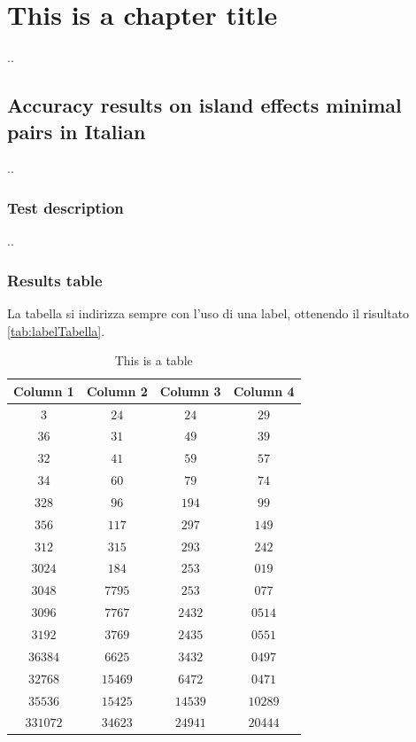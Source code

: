 \chapter{This is a chapter title}

..

\section{Accuracy results on island effects minimal pairs in Italian}

..

\subsection{Test description}

..

\subsection{Results table}


La tabella si indirizza sempre con l'uso di una label, ottenendo il risultato \autoref{tab:labelTabella}.

\begin{table}
	\caption{This is a table}\label{tab:labelTabella}
	\begin{center}
		\begin{tabular}{c|c|c|c}
			\textbf{Column 1} & \textbf{Column 2} & \textbf{Column 3} & \textbf{Column 4} \\
			\hline
			$3$      & $24$     & $24$    & $29$ \\ 
			$36$     & $31$     & $49$    & $39$ \\ 
			$32$     & $41$     & $59$    & $57$ \\ 
			$34$     & $60$     & $79$    & $74$ \\ 
			$328$    & $96$     & $194$   & $99$ \\ 
			$356$    & $117$    & $297$   & $149$ \\ 
			$312$    & $315$    & $293$   & $242$ \\ 
			$3024$   & $184$    & $253$   & $019$ \\ 
			$3048$   & $7795$   & $253$   & $077$ \\ 
			$3096$   & $7767$   & $2432$  & $0514$ \\ 
			$3192$   & $3769$   & $2435$  & $0551$ \\ 
			$36384$  & $6625$   & $3432$  & $0497$ \\ 
			$32768$  & $15469$  & $6472$  & $0471$ \\ 
			$35536$  & $15425$  & $14539$ & $10289$ \\ 
			$331072$ & $34623$  & $24941$ & $20444$ \\  
		\end{tabular}
	\end{center}
\end{table}

